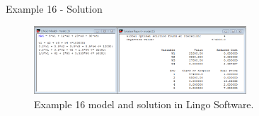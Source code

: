 \begin{frame}{Example 16 - Solution}
\begin{figure}
    \includegraphics[width=300px]{slides/ex16/screenshot.png}
    \caption{Example 16 model and solution in Lingo Software.}
\end{figure}
\end{frame}
